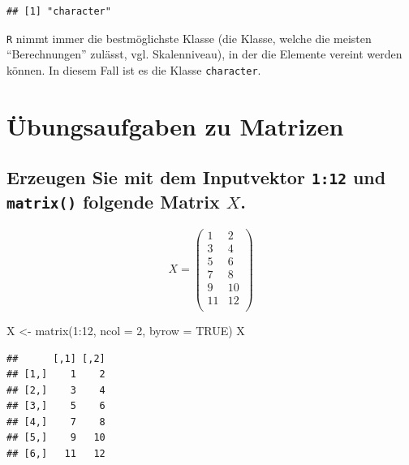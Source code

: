 \documentclass[12pt,a4paper]{article}
\newenvironment{Shaded}{\begin{snugshade}}{\end{snugshade}}
\newcommand{\AttributeTok}[1]{\textcolor[rgb]{0.77,0.63,0.00}{#1}}
\newcommand{\ConstantTok}[1]{\textcolor[rgb]{0.00,0.00,0.00}{#1}}
\newcommand{\DecValTok}[1]{\textcolor[rgb]{0.00,0.00,0.81}{#1}}
\newcommand{\FunctionTok}[1]{\textcolor[rgb]{0.00,0.00,0.00}{#1}}
\newcommand{\NormalTok}[1]{#1}
\newcommand{\OtherTok}[1]{\textcolor[rgb]{0.56,0.35,0.01}{#1}}
\newcommand{\SpecialCharTok}[1]{\textcolor[rgb]{0.00,0.00,0.00}{#1}}
\begin{document}
\begin{verbatim}
## [1] "character"
\end{verbatim}

\texttt{R} nimmt immer die bestmöglichste Klasse (die Klasse, welche die
meisten ``Berechnungen'' zulässt, vgl. Skalenniveau), in der die
Elemente vereint werden können. In diesem Fall ist es die Klasse
\texttt{character}.

\vspace{0.5cm}

\hypertarget{uxfcbungsaufgaben-zu-matrizen}{%
\section{Übungsaufgaben zu
Matrizen}\label{uxfcbungsaufgaben-zu-matrizen}}

\hypertarget{erzeugen-sie-mit-dem-inputvektor-112-und-folgende-matrix-x.}{%
\subsection{\texorpdfstring{Erzeugen Sie mit dem Inputvektor
\texttt{1:12} und \texttt{matrix()} folgende Matrix
\(X\).}{Erzeugen Sie mit dem Inputvektor 1:12 und  folgende Matrix X.}}\label{erzeugen-sie-mit-dem-inputvektor-112-und-folgende-matrix-x.}}

\[ X = \begin{pmatrix} 1 & 2 \\ 3 & 4\\ 5 & 6 \\ 7 & 8 \\
9 & 10 \\ 11 & 12 \\\end{pmatrix}\]

\begin{Shaded}
\begin{Highlighting}[]
\NormalTok{    X }\OtherTok{\textless{}{-}} \FunctionTok{matrix}\NormalTok{(}\DecValTok{1}\SpecialCharTok{:}\DecValTok{12}\NormalTok{, }\AttributeTok{ncol =} \DecValTok{2}\NormalTok{, }\AttributeTok{byrow =} \ConstantTok{TRUE}\NormalTok{)}
\NormalTok{    X}
\end{Highlighting}
\end{Shaded}

\begin{verbatim}
##      [,1] [,2]
## [1,]    1    2
## [2,]    3    4
## [3,]    5    6
## [4,]    7    8
## [5,]    9   10
## [6,]   11   12
\end{verbatim}
\end{document}
